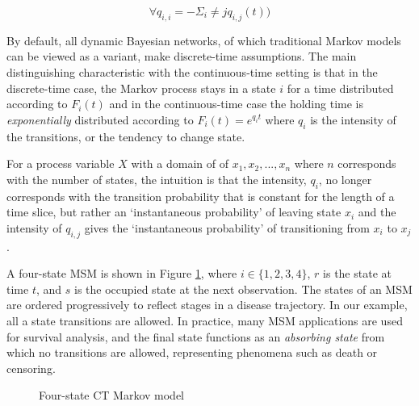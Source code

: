 $$\forall q_{i,i} = -\Sigma_i\neq j q_{i,j}(t))$$





By default, all dynamic Bayesian networks, of which traditional Markov models can be viewed as a variant, make discrete-time assumptions. The main distinguishing characteristic with the continuous-time setting is that in the discrete-time case, the Markov process stays in a state $i$ for a time distributed according to $F_{i}(t)$ and in the continuous-time case the holding time is \emph{exponentially} distributed according to $F_{i}(t) = e^{q_{i}t}$ where $q_{i}$ is the intensity of the transitions, or the tendency to change state.

For a process variable $X$ with a domain of of ${x_1,x_2,...,x_n}$ where $n$ corresponds with the number of states, the intuition is that the intensity, $q_{i}$, no longer corresponds with the transition probability that is constant for the length of a time slice, but rather an `instantaneous probability' of leaving state $x_i$ and the intensity of $q_{i,j}$ gives the `instantaneous probability' of transitioning from $x_i$ to $x_j$.

A four-state MSM is shown in Figure \ref{fig:msm}, where $i \in \{1,2,3,4\}$, $r$ is the state at time $t$, and $s$ is the occupied state at the next observation.  The states of an MSM are ordered progressively to reflect stages in a disease trajectory.  In our example, all a state transitions are allowed.  In practice, many MSM applications are used for survival analysis, and the final state functions as an \emph{absorbing state} from which no transitions are allowed, representing phenomena such as death or censoring.

\begin{figure}
\begin{center}
\end{center}
\caption{Four-state CT Markov model}
\label{fig:msm}
\end{figure}

